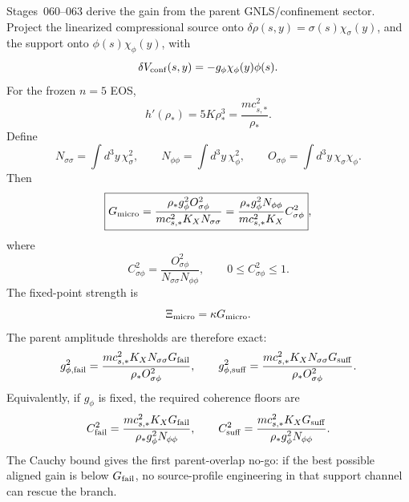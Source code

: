 Stages~060--063 derive the gain from the parent GNLS/confinement sector.  Project the linearized compressional source onto \(\delta\rho(s,y)=\sigma(s)\chi_\sigma(y)\), and the support onto \(\phi(s)\chi_\phi(y)\), with
\begin{equation}
\label{eq:part03-parent-support-loading}
\delta V_{\rm conf}(s,y)=-g_\phi\chi_\phi(y)\phi(s).
\end{equation}
For the frozen \(n=5\) EOS,
\begin{equation}
\label{eq:part03-hprime}
h'(\rho_*)=5K\rho_*^3=\frac{mc_{s,*}^2}{\rho_*}.
\end{equation}
Define
\begin{equation}
\label{eq:part03-parent-overlaps}
N_{\sigma\sigma}=\int d^3y\,\chi_\sigma^2,
\qquad
N_{\phi\phi}=\int d^3y\,\chi_\phi^2,
\qquad
O_{\sigma\phi}=\int d^3y\,\chi_\sigma\chi_\phi.
\end{equation}
Then
\begin{equation}
\label{eq:part03-Gmicro-parent}
\boxed{
G_{\rm micro}
=\frac{\rho_*g_\phi^2O_{\sigma\phi}^2}{mc_{s,*}^2K_XN_{\sigma\sigma}}
=\frac{\rho_*g_\phi^2N_{\phi\phi}}{mc_{s,*}^2K_X}C_{\sigma\phi}^2},
\end{equation}
where
\begin{equation}
\label{eq:part03-Csigma-def}
C_{\sigma\phi}^2=\frac{O_{\sigma\phi}^2}{N_{\sigma\sigma}N_{\phi\phi}},
\qquad
0\leq C_{\sigma\phi}^2\leq1.
\end{equation}
The fixed-point strength is
\begin{equation}
\label{eq:part03-Xi-micro}
\Xi_{\rm micro}=\kappa G_{\rm micro}.
\end{equation}
The parent amplitude thresholds are therefore exact:
\begin{equation}
\label{eq:part03-gphi-thresholds}
g_{\phi,\rm fail}^2
=\frac{mc_{s,*}^2K_XN_{\sigma\sigma}G_{\rm fail}}{\rho_*O_{\sigma\phi}^2},
\qquad
 g_{\phi,\rm suff}^2
=\frac{mc_{s,*}^2K_XN_{\sigma\sigma}G_{\rm suff}}{\rho_*O_{\sigma\phi}^2}.
\end{equation}
Equivalently, if \(g_\phi\) is fixed, the required coherence floors are
\begin{equation}
\label{eq:part03-coherence-thresholds}
C_{\rm fail}^2=\frac{mc_{s,*}^2K_XG_{\rm fail}}{\rho_*g_\phi^2N_{\phi\phi}},
\qquad
C_{\rm suff}^2=\frac{mc_{s,*}^2K_XG_{\rm suff}}{\rho_*g_\phi^2N_{\phi\phi}}.
\end{equation}
The Cauchy bound gives the first parent-overlap no-go: if the best possible aligned gain is below \(G_{\rm fail}\), no source-profile engineering in that support channel can rescue the branch.

